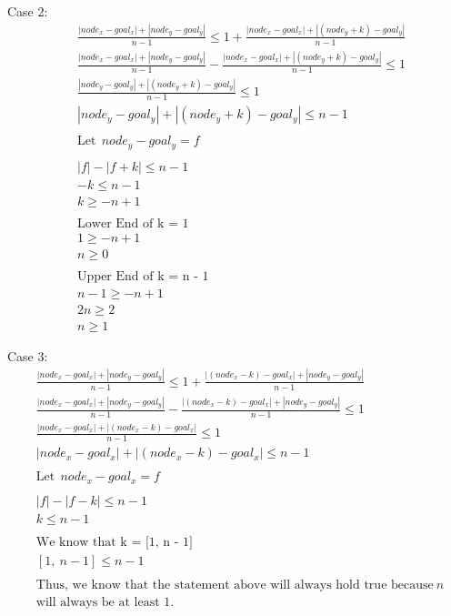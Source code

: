 \documentclass[a4paper]{article}
\begin{document}
\begin{sloppypar}
\begin{enumerate}[start=6,label=Q\arabic*,left=0pt]
    Case 2:
    \begin{align*}
        &\frac{|node_x - goal_x| + |node_y - goal_y|}{n - 1} \leq 1 + \frac{|node_x - goal_x| + |(node_y + k) - goal_y|}{n - 1} \\
        &\frac{|node_x - goal_x| + |node_y - goal_y|}{n - 1} - \frac{|node_x - goal_x| + |(node_y + k) - goal_y|}{n - 1} \leq 1 \\
        &\frac{|node_y - goal_y| + |(node_y + k) - goal_y|}{n - 1} \leq 1 \\
        &|node_y - goal_y| + |(node_y + k) - goal_y| \leq n - 1 \\\\
        &\text{Let} \:\: node_y - goal_y = f \\\\
        &|f| - |f + k| \leq n - 1 \\
        &-k \leq n - 1 \\
        &k \geq -n + 1 \\\\
        &\text{Lower End of k = 1} \\
        &1 \geq -n + 1 \\
        &n \geq 0 \\\\
        &\text{Upper End of k = n - 1} \\
        &n - 1 \geq -n + 1 \\
        &2n \geq 2 \\
        &n \geq 1
    \end{align*}

    Case 3:
    \begin{align*}
        &\frac{|node_x - goal_x| + |node_y - goal_y|}{n - 1} \leq 1 + \frac{|(node_x - k) - goal_x| + |node_y - goal_y|}{n - 1} \\
        &\frac{|node_x - goal_x| + |node_y - goal_y|}{n - 1} - \frac{|(node_x - k) - goal_x| + |node_y - goal_y|}{n - 1} \leq 1 \\
        &\frac{|node_x - goal_x| + |(node_x - k) - goal_x|}{n - 1} \leq 1 \\
        &|node_x - goal_x| + |(node_x - k) - goal_x| \leq n - 1 \\\\
        &\text{Let} \:\: node_x - goal_x = f \\\\
        &|f| - |f - k| \leq n - 1 \\
        &k \leq n - 1 \\\\
        &\text{We know that k = [1, n - 1]} \\
        &[1, \: n - 1] \leq n - 1 \\\\
        &\text{Thus, we know that the statement above will always hold true because} \: n \: \\
        &\text{will always be at least 1.}
    \end{align*} 


\end{enumerate}
\end{sloppypar}
\end{document}

